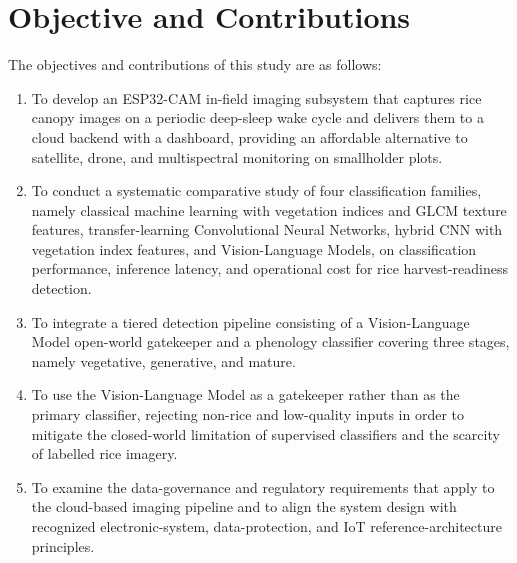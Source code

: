 \section{Objective and Contributions}
The objectives and contributions of this study are as follows:
\begin{enumerate}
    \item To develop an ESP32-CAM in-field imaging subsystem that captures rice canopy images on a periodic deep-sleep wake cycle and delivers them to a cloud backend with a dashboard, providing an affordable alternative to satellite, drone, and multispectral monitoring on smallholder plots.

    \item To conduct a systematic comparative study of four classification families, namely classical machine learning with vegetation indices and GLCM texture features, transfer-learning Convolutional Neural Networks, hybrid CNN with vegetation index features, and Vision-Language Models, on classification performance, inference latency, and operational cost for rice harvest-readiness detection.

    \item To integrate a tiered detection pipeline consisting of a Vision-Language Model open-world gatekeeper and a phenology classifier covering three stages, namely vegetative, generative, and mature.

    \item To use the Vision-Language Model as a gatekeeper rather than as the primary classifier, rejecting non-rice and low-quality inputs in order to mitigate the closed-world limitation of supervised classifiers and the scarcity of labelled rice imagery.

    \item To examine the data-governance and regulatory requirements that apply to the cloud-based imaging pipeline and to align the system design with recognized electronic-system, data-protection, and IoT reference-architecture principles.
\end{enumerate}


